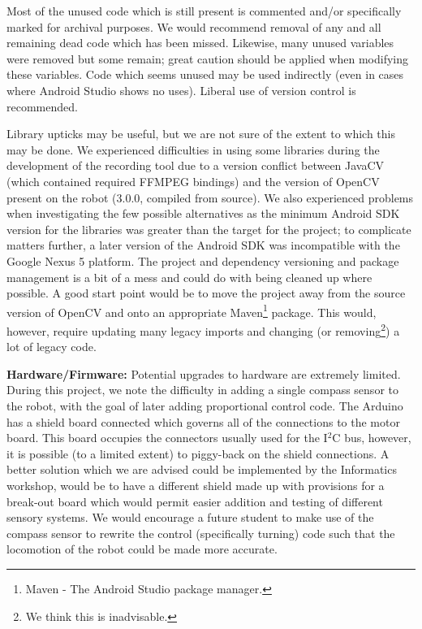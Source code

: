 \documentclass[a4paper,11pt,twoside,openright]{article}
\begin{document}
Most of the unused code which is still present is commented and/or
specifically marked for archival purposes. We would recommend removal
of any and all remaining dead code which has been missed. Likewise,
many unused variables were removed but some remain; great caution
should be applied when modifying these variables. Code which seems
unused may be used indirectly (even in cases where Android Studio
shows no uses). Liberal use of version control is recommended.
\newline\par

Library upticks may be useful, but we are not sure of the extent to
which this may be done. We experienced difficulties in using some
libraries during the development of the recording tool due to a
version conflict between JavaCV (which contained required FFMPEG
bindings) and the version of OpenCV present on the robot (3.0.0,
compiled from source). We also experienced problems when investigating
the few possible alternatives as the minimum Android SDK version for
the libraries was greater than the target for the project; to
complicate matters further, a later version of the Android SDK was
incompatible with the Google Nexus 5 platform. The project and
dependency versioning and package management is a bit of a mess and
could do with being cleaned up where possible. A good start point
would be to move the project away from the source version of OpenCV
and onto an appropriate Maven\footnote{Maven - The Android Studio
  package manager.} package. This would, however, require updating
many legacy imports and changing (or removing\footnote{We think this
  is inadvisable.}) a lot of legacy code.\newline\par

\textbf{Hardware/Firmware:}
Potential upgrades to hardware are extremely limited. During this
project, we note the difficulty in adding a single compass sensor to
the robot, with the goal of later adding proportional control
code. The Arduino has a shield board connected which governs all of
the connections to the motor board. This board occupies the connectors
usually used for the I$^2$C bus, however, it is possible (to a limited
extent) to piggy-back on the shield connections. A better solution
which we are advised could be implemented by the Informatics workshop,
would be to have a different shield made up with provisions for a
break-out board which would permit easier addition and testing of
different sensory systems. We would encourage a future student to
make use of the compass sensor to rewrite the control (specifically
turning) code such that the locomotion of the robot could be made more
accurate.\newline\par
\end{document}
